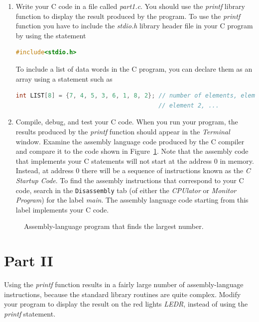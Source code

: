 \documentclass[epsfig,10pt,fullpage]{article}
\begin{document}
\begin{enumerate}
\item
Write your C code in a file called {\it part1.c}.  You should use the {\it printf}
library function to display the result produced by the program. To use the {\it printf} function 
you have to include the {\it stdio.h} library header file in your C program by using the statement

\begin{lstlisting}[language=C]
#include<stdio.h>
\end{lstlisting}

To include a list of data words in the C program, you can declare them as an array using
a statement such as

\begin{lstlisting}[language=C]
int LIST[8] = {7, 4, 5, 3, 6, 1, 8, 2}; // number of elements, element 1,
                                        // element 2, ...
\end{lstlisting}

\item
Compile, debug, and test your C code.  When you run your program, the results produced by the
{\it printf} function should appear in the {\it Terminal} window.
Examine the assembly language code produced by the C compiler and compare it to the code 
shown in Figure~\ref{fig:code}. Note that the assembly code that implements your C
statements will not start at the address 0 in memory. Instead, at address 0 there will be 
a sequence of instructions known as the {\it C Startup Code}. To find the assembly
instructions that correspond to your C code, search in the \texttt{Disassembly} tab 
(of either the {\it CPUlator} or {\it Monitor Program}) for the label {\it main}. The 
assembly language code starting from this label implements your C code. 
\end{enumerate}

\begin{figure}[H]
\begin{center}

\end{center}
\caption{Assembly-language program that finds the largest number.}
\label{fig:code}
\end{figure}

\section*{Part II}
Using the {\it printf} function results in a fairly large number of assembly-language instructions,
because the standard library routines are quite complex. Modify your program to display the 
result on the red lights {\it LEDR}, instead of using the {\it printf} statement. 
\end{document}
